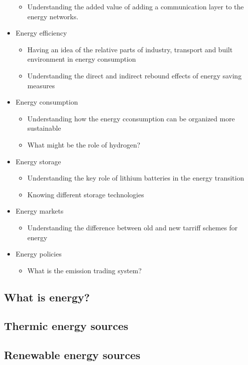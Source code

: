 \documentclass[../summary.tex]{subfiles}
\begin{document}
\begin{itemize}
\begin{itemize}
		\item Understanding the added value of adding a communication layer to the energy networks.
		\end{itemize}
	\item Energy efficiency
		\begin{itemize} 
		\item Having an idea of the relative parts of industry, transport and built environment in energy
		consumption
		\item Understanding the direct and indirect rebound effects of energy saving measures
		\end{itemize}
	\item Energy consumption
		\begin{itemize} 
		\item Understanding how the energy cconsumption can be organized more sustainable
		\item What might be the role of hydrogen?
		\end{itemize}
	\item Energy storage
		\begin{itemize} 
		\item Understanding the key role of lithium batteries in the energy transition
		\item Knowing different storage technologies
		\end{itemize}
	\item Energy markets
		\begin{itemize} 
		\item Understanding the difference between old and new tarriff schemes for energy
		\end{itemize}
	\item Energy policies
		\begin{itemize} 
		\item What is the emission trading system?
		\end{itemize}
	\end{itemize}
	
	\subsection{What is energy?}
	\subsection{Thermic energy sources}
	\subsection{Renewable energy sources}
\end{document}
